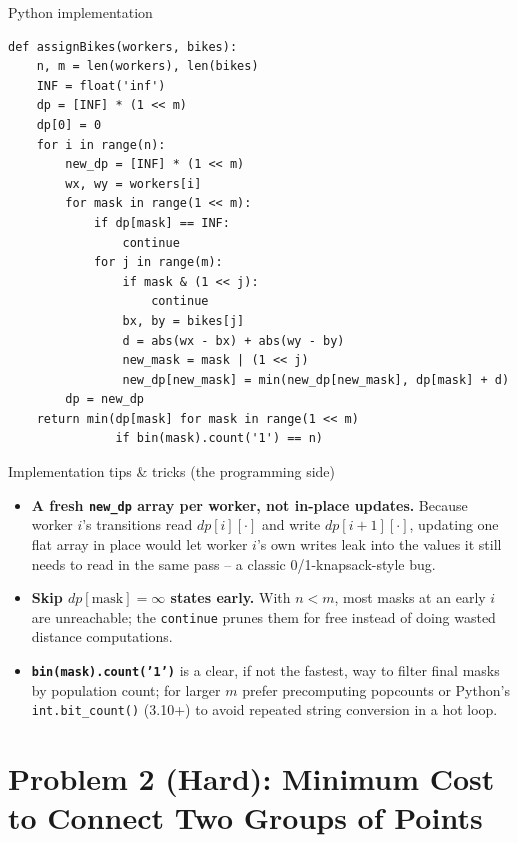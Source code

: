 \documentclass[11pt,aspectratio=169]{beamer}
\begin{document}
\begin{frame}[fragile]{Python implementation}
  \begin{lstlisting}[style=py,aboveskip=0pt,belowskip=0pt]
def assignBikes(workers, bikes):
    n, m = len(workers), len(bikes)
    INF = float('inf')
    dp = [INF] * (1 << m)
    dp[0] = 0
    for i in range(n):
        new_dp = [INF] * (1 << m)
        wx, wy = workers[i]
        for mask in range(1 << m):
            if dp[mask] == INF:
                continue
            for j in range(m):
                if mask & (1 << j):
                    continue
                bx, by = bikes[j]
                d = abs(wx - bx) + abs(wy - by)
                new_mask = mask | (1 << j)
                new_dp[new_mask] = min(new_dp[new_mask], dp[mask] + d)
        dp = new_dp
    return min(dp[mask] for mask in range(1 << m)
               if bin(mask).count('1') == n)
  \end{lstlisting}
\end{frame}

\begin{frame}{Implementation tips \& tricks (the programming side)}
  \small
  \begin{itemize}
    \item \textbf{A fresh \texttt{new\_dp} array per worker, not in-place updates.}
    Because worker $i$'s transitions read $dp[i][\cdot]$ and write $dp[i{+}1][\cdot]$,
    updating one flat array in place would let worker $i$'s own writes leak into the
    values it still needs to read in the same pass -- a classic 0/1-knapsack-style bug.
    \item \textbf{Skip $dp[\text{mask}]=\infty$ states early.} With $n<m$, most masks at
    an early $i$ are unreachable; the \texttt{continue} prunes them for free instead of
    doing wasted distance computations.
    \item \textbf{\texttt{bin(mask).count('1')}} is a clear, if not the fastest, way to
    filter final masks by population count; for larger $m$ prefer precomputing
    popcounts or Python's \texttt{int.bit\_count()} (3.10+) to avoid repeated string
    conversion in a hot loop.
  \end{itemize}
\end{frame}

\section{Problem 2 (Hard): Minimum Cost to Connect Two Groups of Points}
\end{document}
